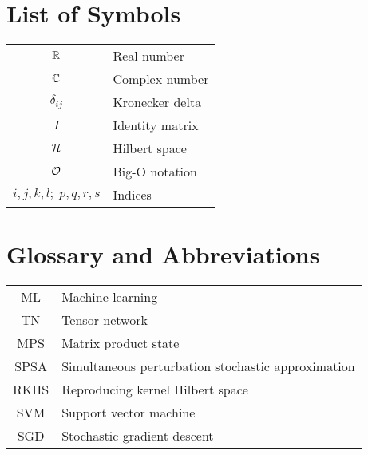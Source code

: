 \chapter*{List of Symbols}
\begin{tabular}{c p{}}
    $\mathbb{R}$ & Real number \\
    $\mathbb{C}$ & Complex number \\
    $\delta_{ij}$ & Kronecker delta \\
    $I$ & Identity matrix \\
    $\mathcal{H}$ & Hilbert space \\
    $\mathcal{O}$ & Big-O notation \\
    $i,j,k,l;\; p,q,r,s$ & Indices \\
\end{tabular}



\chapter*{Glossary and Abbreviations}
\begin{tabular}{c p{}}
    ML & Machine learning \\
    TN & Tensor network \\
    MPS & Matrix product state \\
    SPSA & Simultaneous perturbation stochastic approximation \\
    RKHS & Reproducing kernel Hilbert space \\
    SVM & Support vector machine \\
    SGD & Stochastic gradient descent \\
\end{tabular}

